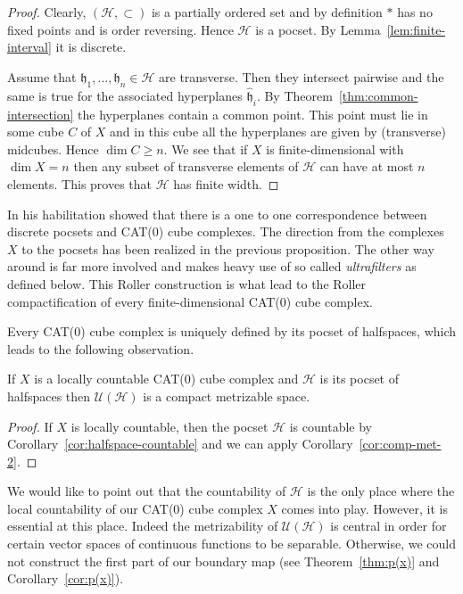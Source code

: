 \begin{proof}
  Clearly, \((\mathcal{H}, \subset)\) is a partially ordered set and by definition \(\ast\) has no fixed points and is order reversing. Hence \(\mathcal{H}\) is a pocset. By Lemma~\ref{lem:finite-interval} it is discrete.

  Assume that \(\mathfrak{h}_1, \dots, \mathfrak{h}_n \in \mathcal{H}\) are transverse. Then they intersect pairwise and the same is true for the associated hyperplanes \(\mathfrak{\hat h}_i\). By Theorem~\ref{thm:common-intersection} the hyperplanes contain a common point. This point must lie in some cube \(C\) of \(X\) and in this cube all the hyperplanes are given by (transverse) midcubes. Hence \(\dim C \geq n\). We see that if \(X\) is finite-dimensional with \(\dim X = n\) then any subset of transverse elements of \(\mathcal{H}\) can have at most \(n\) elements. This proves that \(\mathcal{H}\) has finite width.
\end{proof}

\begin{rem}
  \label{rem:roller}
  In his habilitation \textcite{Roller1999} showed that there is a one to one correspondence between discrete pocsets and CAT(0) cube complexes. The direction from the complexes \(X\) to the pocsets has been realized in the previous proposition. The other way around is far more involved and makes heavy use of so called \emph{ultrafilters} as defined below. This Roller construction is what lead to the Roller compactification of every finite-dimensional CAT(0) cube complex.

  Every CAT(0) cube complex is uniquely defined by its pocset of halfspaces, which leads to the following observation.
\end{rem}

\begin{cor}
  \label{cor:comp-met}
  If \(X\) is a locally countable CAT(0) cube complex and \(\mathcal{H}\) is its pocset of halfspaces then \(\mathcal{U}(\mathcal{H})\) is a compact metrizable space.
\end{cor}

\begin{proof}
  If \(X\) is locally countable, then the pocset \(\mathcal{H}\) is countable by Corollary~\ref{cor:halfspace-countable} and we can apply Corollary~\ref{cor:comp-met-2}.
\end{proof}

\begin{rem}
  We would like to point out that the countability of \(\mathcal{H}\) is the only place where the local countability of our CAT(0) cube complex \(X\) comes into play. However, it is essential at this place. Indeed the metrizability of \(\mathcal{U}(\mathcal{H})\) is central in order for certain vector spaces of continuous functions to be separable. Otherwise, we could not construct the first part of our boundary map (see Theorem~\ref{thm:p(x)} and Corollary~\ref{cor:p(x)}).
\end{rem}

